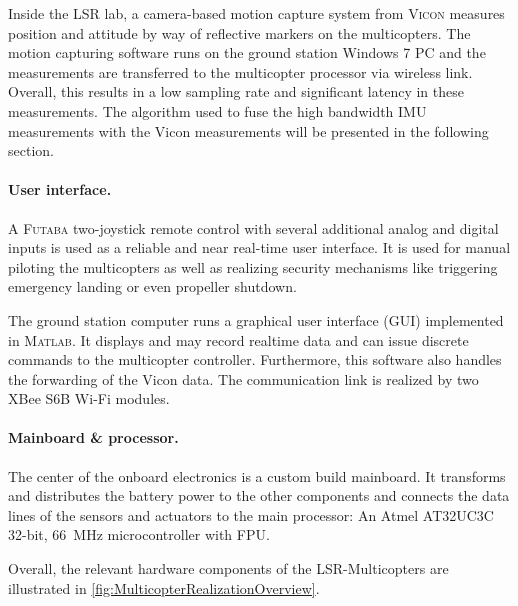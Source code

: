 Inside the LSR lab, a camera-based motion capture system from \textsc{Vicon} measures position and attitude by way of reflective markers on the multicopters.
The motion capturing software runs on the ground station Windows 7 PC and the measurements are transferred to the multicopter processor via wireless link.
Overall, this results in a low sampling rate and significant latency in these measurements.
The algorithm used to fuse the high bandwidth IMU measurements with the Vicon measurements will be presented in the following section.

\paragraph{User interface.}
A \textsc{Futaba} two-joystick remote control with several additional analog and digital inputs is used as a reliable and near real-time user interface.
It is used for manual piloting the multicopters as well as realizing security mechanisms like triggering emergency landing or even propeller shutdown.

The ground station computer runs a graphical user interface (GUI) implemented in \textsc{Matlab}. 
It displays and may record realtime data and can issue discrete commands to the multicopter controller.
Furthermore, this software also handles the forwarding of the Vicon data. 
The communication link is realized by two XBee S6B Wi-Fi modules.

\paragraph{Mainboard \& processor.}
The center of the onboard electronics is a custom build mainboard.
It transforms and distributes the battery power to the other components and connects the data lines of the sensors and actuators to the main processor:
An Atmel AT32UC3C 32-bit, 66~\unit{MHz} microcontroller with FPU.

Overall, the relevant hardware components of the LSR-Multicopters are illustrated in \autoref{fig:MulticopterRealizationOverview}.


